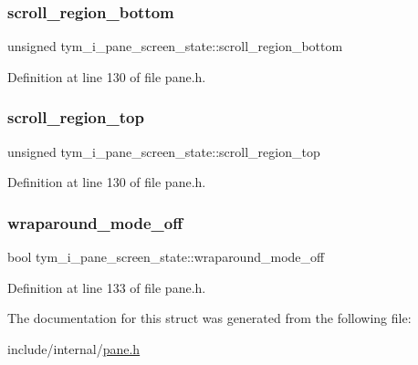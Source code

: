 \subsubsection{\texorpdfstring{scroll\+\_\+region\+\_\+bottom}{scroll\_region\_bottom}}
{\footnotesize\ttfamily unsigned tym\+\_\+i\+\_\+pane\+\_\+screen\+\_\+state\+::scroll\+\_\+region\+\_\+bottom}



Definition at line 130 of file pane.\+h.

\mbox{\label{structtym__i__pane__screen__state_af3665243e3d6dc3e117edc2cc4486144}} 
\subsubsection{\texorpdfstring{scroll\+\_\+region\+\_\+top}{scroll\_region\_top}}
{\footnotesize\ttfamily unsigned tym\+\_\+i\+\_\+pane\+\_\+screen\+\_\+state\+::scroll\+\_\+region\+\_\+top}



Definition at line 130 of file pane.\+h.

\mbox{\label{structtym__i__pane__screen__state_aa47e037b07d6b0d8e14a32c9ad13dd0d}} 
\subsubsection{\texorpdfstring{wraparound\+\_\+mode\+\_\+off}{wraparound\_mode\_off}}
{\footnotesize\ttfamily bool tym\+\_\+i\+\_\+pane\+\_\+screen\+\_\+state\+::wraparound\+\_\+mode\+\_\+off}



Definition at line 133 of file pane.\+h.



The documentation for this struct was generated from the following file\+:\begin{DoxyCompactItemize}
\item 
include/internal/\hyperlink{pane_8h}{pane.\+h}\end{DoxyCompactItemize}
